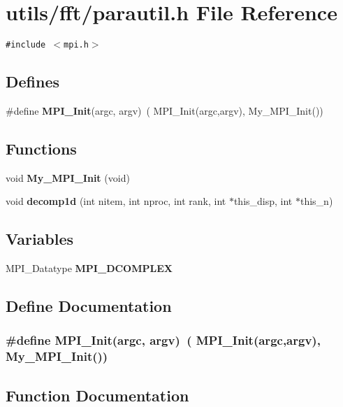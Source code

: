 \section{utils/fft/parautil.h File Reference}
\label{parautil_8h}
{\tt \#include $<$mpi.h$>$}\par
\subsection*{Defines}
\begin{CompactItemize}
\item 
\#define {\bf MPI\_\-Init}(argc, argv)~( MPI\_\-Init(argc,argv), My\_\-MPI\_\-Init())
\end{CompactItemize}
\subsection*{Functions}
\begin{CompactItemize}
\item 
void {\bf My\_\-MPI\_\-Init} (void)
\item 
void {\bf decomp1d} (int nitem, int nproc, int rank, int $\ast$this\_\-disp, int $\ast$this\_\-n)
\end{CompactItemize}
\subsection*{Variables}
\begin{CompactItemize}
\item 
MPI\_\-Datatype {\bf MPI\_\-DCOMPLEX}
\end{CompactItemize}


\subsection{Define Documentation}
\subsubsection{\setlength{\rightskip}{0pt plus 5cm}\#define MPI\_\-Init(argc, argv)~( MPI\_\-Init(argc,argv), My\_\-MPI\_\-Init())}\label{parautil_8h_d03cf2da10d90d9a471ebb6847ef21c1}




\subsection{Function Documentation}
